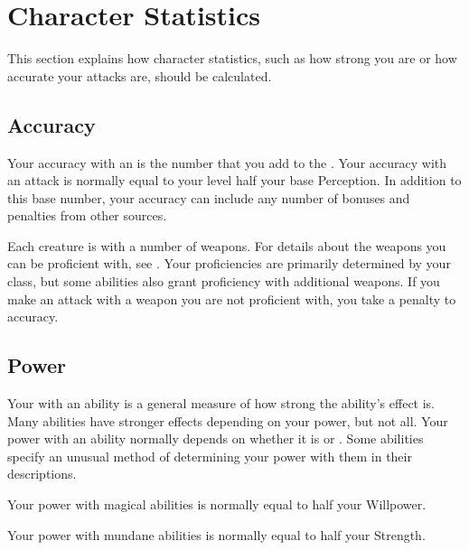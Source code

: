 \section{Character Statistics}
    This section explains how character statistics, such as how strong you are or how accurate your attacks are, should be calculated.

    \subsection{Accuracy}\label{Accuracy}
        Your accuracy with an  is the number that you add to the .
        Your accuracy with an attack is normally equal to your level \add half your base Perception.
        In addition to this base number, your accuracy can include any number of bonuses and penalties from other sources.

         Each creature is  with a number of weapons.
        For details about the weapons you can be proficient with, see .
        Your proficiencies are primarily determined by your class, but some abilities also grant proficiency with additional weapons.
        If you make an attack with a weapon you are not proficient with, you take a  penalty to accuracy.

    \subsection{Power}\label{Power}
        Your  with an ability is a general measure of how strong the ability's effect is.
        Many abilities have stronger effects depending on your power, but not all.
        Your power with an ability normally depends on whether it is  or .
        Some abilities specify an unusual method of determining your power with them in their descriptions.

        Your power with magical abilities is normally equal to half your Willpower.

        Your power with mundane abilities is normally equal to half your Strength.

